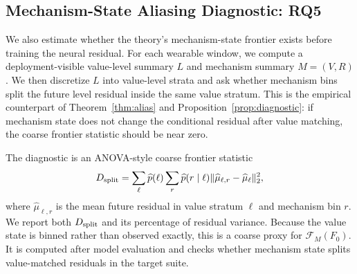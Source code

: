 ﻿\documentclass[10pt,conference]{IEEEtran}
\newcommand{\baseT}{\textnormal{\mbox{tPatchGNN}}}
\begin{document}
\begin{table}[H]
\centering
\caption{Mechanism-state controls. Entries are paired MSE/MAE gain percentages
over the same frozen \baseT{} checkpoint.}
\label{tab:state-control}
\footnotesize
{}
\end{table}

\subsection{Mechanism-State Aliasing Diagnostic: RQ5}

We also estimate whether the theory's mechanism-state frontier exists before
training the neural residual.  For each wearable window, we compute a
deployment-visible value-level summary \(L\) and mechanism summary \(M=(V,R)\).
We then discretize \(L\) into value-level strata and ask whether mechanism
bins split the future level residual inside the same value stratum.  This is
the empirical counterpart of Theorem~\ref{thm:alias} and
Proposition~\ref{prop:diagnostic}: if mechanism state does not change the
conditional residual after value matching, the coarse frontier statistic should
be near zero.

The diagnostic is an ANOVA-style coarse frontier statistic
\begin{equation}
D_{\rm split}
=
\sum_\ell \widehat p(\ell)
\sum_r \widehat p(r\mid \ell)
\|\widehat\mu_{\ell,r}-\widehat\mu_{\ell}\|_2^2,
\end{equation}
where \(\widehat\mu_{\ell,r}\) is the mean future residual in value stratum
\(\ell\) and mechanism bin \(r\).  We report both \(D_{\rm split}\) and its
percentage of residual variance.  Because the value state is binned rather
than observed exactly, this is a coarse proxy for \(\mathcal{F}_M(F_0)\).  It is
computed after model evaluation and checks whether mechanism state splits
value-matched residuals in the target suite.
\end{document}
